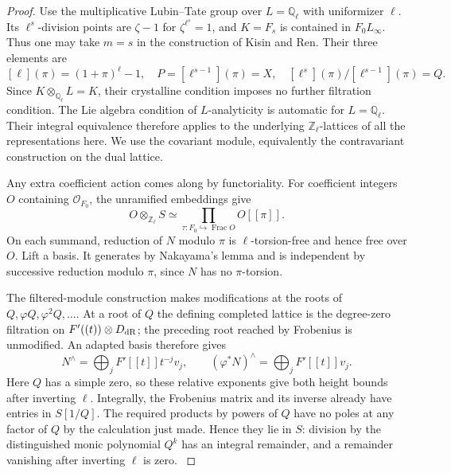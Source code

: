 \begin{proof}
Use the multiplicative Lubin--Tate group over \(L=\mathbb Q_\ell\) with uniformizer \(\ell\). Its \(\ell^s\)-division points are \(\zeta-1\) for \(\zeta^{\ell^s}=1\), and \(K=F_s\) is contained in \(F_0L_\infty\). Thus one may take \(m=s\) in the construction of Kisin and Ren. Their three elements are
\[
 [\ell](\pi)=(1+\pi)^\ell-1,\quad
 P=[\ell^{s-1}](\pi)=X,\quad
 [\ell^s](\pi)/[\ell^{s-1}](\pi)=Q .
\]
Since \(K\otimes_{\mathbb Q_\ell}L=K\), their crystalline condition imposes no further filtration condition. The Lie algebra condition of \(L\)-analyticity is automatic for \(L=\mathbb Q_\ell\). Their integral equivalence therefore applies to the underlying \(\mathbb Z_\ell\)-lattices of all the representations here. We use the covariant module, equivalently the contravariant construction on the dual lattice. \cite[Sections~2.1, 2.4 and Corollary~3.3.8]{kisin-ren-lubin-tate}

Any extra coefficient action comes along by functoriality. For coefficient integers \(O\) containing \(\mathcal O_{F_0}\), the unramified embeddings give
\[
 O\otimes_{\mathbb Z_\ell} S\simeq
   \prod_{\tau:F_0\hookrightarrow\operatorname{Frac}O} O[[\pi]] .
\] On each summand, reduction of \(N\) modulo \(\pi\) is \(\ell\)-torsion-free and hence free over \(O\). Lift a basis. It generates by Nakayama's lemma and is independent by successive reduction modulo \(\pi\), since \(N\) has no \(\pi\)-torsion.

The filtered-module construction makes modifications at the roots of \(Q,\varphi Q,\varphi^2 Q,\ldots\). At a root of \(Q\) the defining completed lattice is the degree-zero filtration on \(F'((t))\otimes D_{\rm dR}\); the preceding root reached by Frobenius is unmodified. An adapted basis therefore gives
\[
   N^{\wedge}=\bigoplus_j F'[[t]]t^{-j}v_j,\qquad
   (\varphi^*N)^{\wedge}=\bigoplus_j F'[[t]]v_j .
\]
Here \(Q\) has a simple zero, so these relative exponents give both height bounds after inverting \(\ell\). Integrally, the Frobenius matrix and its inverse already have entries in \(S[1/Q]\). The required products by powers of \(Q\) have no poles at any factor of \(Q\) by the calculation just made. Hence they lie in \(S\): division by the distinguished monic polynomial \(Q^k\) has an integral remainder, and a remainder vanishing after inverting \(\ell\) is zero. \cite[Section~2.2, Lemmas~2.2.1 and~2.2.5]{kisin-ren-lubin-tate}


\end{proof}
